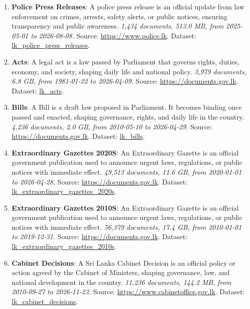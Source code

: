 \documentclass[10pt,a4paper]{article}%
\begin{document}
\begin{enumerate}
\item%
\textbf{Police Press Releases}: A police press release is an official update from law enforcement on crimes, arrests, safety alerts, or public notices, ensuring transparency and public awareness.\textit{ 1,434 documents, 513.0 MB, from 2025{-}05{-}01 to 2026{-}08{-}08.} Source: \href{https://www.police.lk}{https://www.police.lk}. Dataset: \href{https://github.com/nuuuwan/lk\_police\_press\_releases/tree/data/data/lk\_police\_press\_releases}{lk\_police\_press\_releases}.%
\item%
\textbf{Acts}: A legal act is a law passed by Parliament that governs rights, duties, economy, and society, shaping daily life and national policy.\textit{ 3,979 documents, 6.8 GB, from 1981{-}01{-}22 to 2026{-}04{-}09.} Source: \href{https://documents.gov.lk}{https://documents.gov.lk}. Dataset: \href{https://github.com/nuuuwan/lk\_legal\_docs/tree/data\_lk\_acts/data/lk\_acts}{lk\_acts}.%
\item%
\textbf{Bills}: A Bill is a draft law proposed in Parliament. It becomes binding once passed and enacted, shaping governance, rights, and daily life in the country.\textit{ 4,236 documents, 2.0 GB, from 2010{-}05{-}10 to 2026{-}04{-}29.} Source: \href{https://documents.gov.lk}{https://documents.gov.lk}. Dataset: \href{https://github.com/nuuuwan/lk\_legal\_docs/tree/data\_lk\_bills/data/lk\_bills}{lk\_bills}.%
\item%
\textbf{Extraordinary Gazettes 2020S}: An Extraordinary Gazette is an official government publication used to announce urgent laws, regulations, or public notices with immediate effect.\textit{ 49,513 documents, 11.6 GB, from 2020{-}01{-}01 to 2026{-}04{-}28.} Source: \href{https://documents.gov.lk}{https://documents.gov.lk}. Dataset: \href{https://github.com/nuuuwan/lk\_legal\_docs/tree/data\_lk\_extraordinary\_gazettes\_2020s/data/lk\_extraordinary\_gazettes\_2020s}{lk\_extraordinary\_gazettes\_2020s}.%
\item%
\textbf{Extraordinary Gazettes 2010S}: An Extraordinary Gazette is an official government publication used to announce urgent laws, regulations, or public notices with immediate effect.\textit{ 56,379 documents, 17.4 GB, from 2010{-}01{-}01 to 2019{-}12{-}31.} Source: \href{https://documents.gov.lk}{https://documents.gov.lk}. Dataset: \href{https://github.com/nuuuwan/lk\_legal\_docs/tree/data\_lk\_extraordinary\_gazettes\_2010s/data/lk\_extraordinary\_gazettes\_2010s}{lk\_extraordinary\_gazettes\_2010s}.%
\item%
\textbf{Cabinet Decisions}: A Sri Lanka Cabinet Decision is an official policy or action agreed by the Cabinet of Ministers, shaping governance, law, and national development in the country.\textit{ 11,236 documents, 144.2 MB, from 2010{-}09{-}27 to 2026{-}11{-}23.} Source: \href{https://www.cabinetoffice.gov.lk}{https://www.cabinetoffice.gov.lk}. Dataset: \href{https://github.com/nuuuwan/lk\_cabinet\_decisions/tree/data/data/lk\_cabinet\_decisions}{lk\_cabinet\_decisions}.%

\end{enumerate}
\end{document}
